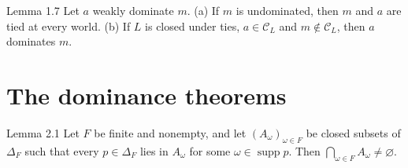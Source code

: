 \documentclass[11pt]{article}
\newcommand{\C}{\mathcal C}
\newcommand{\supp}{\operatorname{supp}}
\DeclareRobustCommand{\stp}[1]{\tikz[baseline=(n.base)]\node[circle,draw,inner sep=0.7pt,minimum size=11pt,font=\scriptsize\bfseries](n){#1};}
\newenvironment{steps}{\begin{enumerate}[label=\stp{\arabic*},leftmargin=*,itemsep=2pt]}{\end{enumerate}}
\begin{document}
\begin{stmt}{Lemma 1.7}
Let $a$ weakly dominate $m$. (a) If $m$ is undominated, then $m$ and $a$ are tied at every world. (b) If $L$ is closed under ties, $a\in\C_L$ and $m\notin\C_L$, then $a$ dominates $m$. %
\end{stmt}

\section{The dominance theorems}

\begin{stmt}{Lemma 2.1}
Let $F$ be finite and nonempty, and let $(A_\omega)_{\omega\in F}$ be closed subsets of $\Delta_F$ such that every $p\in\Delta_F$ lies in $A_\omega$ for some $\omega\in\supp p$. Then $\bigcap_{\omega\in F}A_\omega\ne\varnothing$.
\end{stmt}
\end{document}
